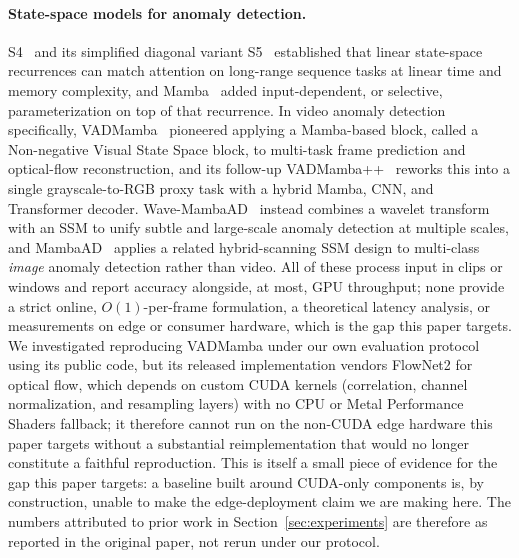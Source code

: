 \paragraph{State-space models for anomaly detection.}
S4~\cite{gu2022s4} and its simplified diagonal variant S5~\cite{smith2023s5} established that linear state-space recurrences can match attention on long-range sequence tasks at linear time and memory complexity, and Mamba~\cite{gu2023mamba} added input-dependent, or selective, parameterization on top of that recurrence. In video anomaly detection specifically, VADMamba~\cite{vadmamba2025} pioneered applying a Mamba-based block, called a Non-negative Visual State Space block, to multi-task frame prediction and optical-flow reconstruction, and its follow-up VADMamba++~\cite{vadmambaplusplus2026} reworks this into a single grayscale-to-RGB proxy task with a hybrid Mamba, CNN, and Transformer decoder. Wave-MambaAD~\cite{wavemambaad2025} instead combines a wavelet transform with an SSM to unify subtle and large-scale anomaly detection at multiple scales, and MambaAD~\cite{mambaad2024} applies a related hybrid-scanning SSM design to multi-class \emph{image} anomaly detection rather than video. All of these process input in clips or windows and report accuracy alongside, at most, GPU throughput; none provide a strict online, $O(1)$-per-frame formulation, a theoretical latency analysis, or measurements on edge or consumer hardware, which is the gap this paper targets. We investigated reproducing VADMamba under our own evaluation protocol using its public code, but its released implementation vendors FlowNet2 for optical flow, which depends on custom CUDA kernels (correlation, channel normalization, and resampling layers) with no CPU or Metal Performance Shaders fallback; it therefore cannot run on the non-CUDA edge hardware this paper targets without a substantial reimplementation that would no longer constitute a faithful reproduction. This is itself a small piece of evidence for the gap this paper targets: a baseline built around CUDA-only components is, by construction, unable to make the edge-deployment claim we are making here. The numbers attributed to prior work in Section~\ref{sec:experiments} are therefore as reported in the original paper, not rerun under our protocol.

